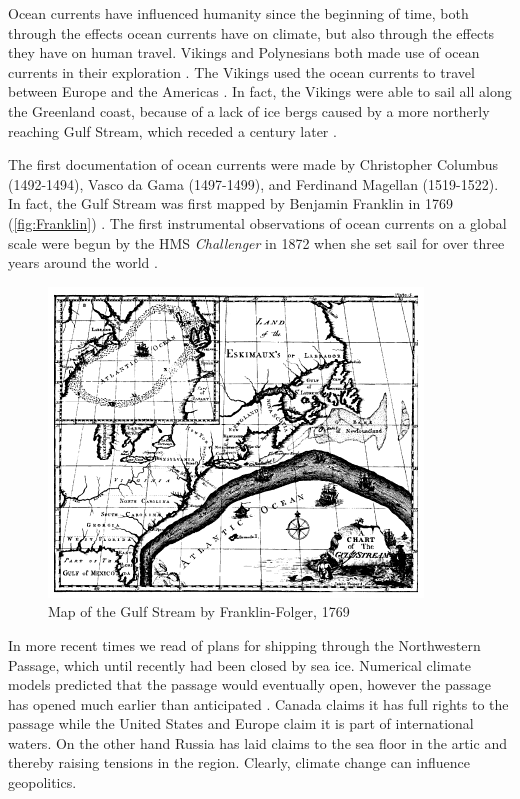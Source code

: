 Ocean currents have influenced humanity since the beginning of time, both
through the effects ocean currents have on climate, but also through the effects
they have on human travel. Vikings and Polynesians both made use of ocean
currents in their exploration \cite{Dijkstra08, Ingstad}. The Vikings used the
ocean currents to travel between Europe and the Americas \cite{Ingstad}. In
fact, the Vikings were able to sail all along the Greenland coast, because of a
lack of ice bergs caused by a more northerly reaching Gulf Stream, which receded
a century later \cite{Morner95}.

The first documentation of ocean currents were made by Christopher Columbus
(1492-1494), Vasco da Gama (1497-1499), and Ferdinand Magellan (1519-1522). In
fact, the Gulf Stream was first mapped by Benjamin Franklin in 1769
(\autoref{fig:Franklin}) \cite{Dijkstra08, Vallis06}. The first instrumental
observations of ocean currents on a global scale were begun by the HMS
\emph{Challenger} in 1872 when she set sail for over three years around the
world \cite{Siedler01}.

\begin{figure}%
  \begin{center}
    \includegraphics[scale=0.5]{Franklin-Folger.png}
    \caption{Map of the Gulf Stream by Franklin-Folger, 1769}
    \label{fig:Franklin}
  \end{center}
\end{figure}

In more recent times we read of plans for shipping through the Northwestern
Passage, which until recently had been closed by sea ice. Numerical climate
models predicted that the passage would eventually open, however the passage has
opened much earlier than anticipated \cite{NatGeo}. Canada claims it has full
rights to the passage while the United States and Europe claim it is part of
international waters. On the other hand Russia has laid claims to the sea floor
in the artic and thereby raising tensions in the region. Clearly, climate change
can influence geopolitics.

